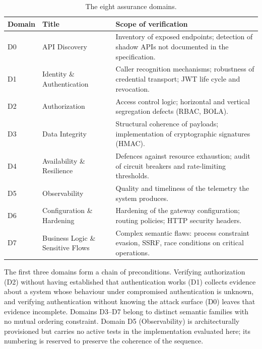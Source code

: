 \documentclass[
]{ceurart}
\begin{document}
\begin{table}
  \caption{The eight assurance domains.}
  \label{tab:domains}
  \begin{tabular}{p{} p{} p{}}
    \toprule
    \textbf{Domain} & \textbf{Title}                    & \textbf{Scope of verification}                                                                    \\
    \midrule
    D0              & API Discovery                     & Inventory of exposed endpoints; detection of shadow APIs not documented in the specification.     \\
    D1              & Identity \& Authentication        & Caller recognition mechanisms; robustness of credential transport; JWT life cycle and revocation. \\
    D2              & Authorization                     & Access control logic; horizontal and vertical segregation defects (RBAC, BOLA).                   \\
    D3              & Data Integrity                    & Structural coherence of payloads; implementation of cryptographic signatures (HMAC).              \\
    D4              & Availability \& Resilience        & Defences against resource exhaustion; audit of circuit breakers and rate-limiting thresholds.     \\
    D5              & Observability                     & Quality and timeliness of the telemetry the system produces.                                      \\
    D6              & Configuration \& Hardening        & Hardening of the gateway configuration; routing policies; HTTP security headers.                  \\
    D7              & Business Logic \& Sensitive Flows & Complex semantic flaws: process constraint evasion, SSRF, race conditions on critical operations. \\
    \bottomrule
  \end{tabular}
\end{table}

The first three domains form a chain of preconditions.
Verifying authorization (D2) without having established that authentication works (D1) collects evidence about a system whose behaviour under compromised authentication is unknown, and verifying authentication without knowing the attack surface (D0) leaves that evidence incomplete.
Domains D3--D7 belong to distinct semantic families with no mutual ordering constraint.
Domain D5 (Observability) is architecturally provisioned but carries no active tests in the implementation evaluated here; its numbering is reserved to preserve the coherence of the sequence.
\end{document}

